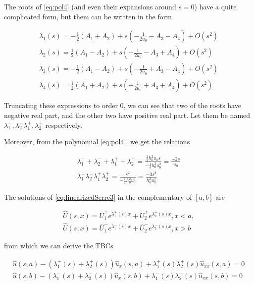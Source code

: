 \indent The roots of \eqref{eq:pol4} (and even their expansions around $s = 0$) have a quite complicated form, but them can be written in the form

\begin{gather*}
	\label{eq:rootsPol4}
	\lambda_1(s) = -\frac{1}{2}(A_1 + A_2) + s \left(-\frac{1}{2u_0} - A_3 - A_4 \right) + O(s^2)  \\
	\lambda_2(s) = \frac{1}{2}(A_1 - A_2) + s \left(-\frac{1}{2u_0} - A_3 + A_4\right) + O(s^2)  \\
	\lambda_3(s) =  -\frac{1}{2}(A_1 - A_2) + s \left(-\frac{1}{2u_0} + A_3 - A_4 \right) + O(s^2) \\
	\lambda_4(s) =  \frac{1}{2}(A_1 + A_2) + s \left(-\frac{1}{2u_0} + A_3 +A_4 \right) + O(s^2) 
\end{gather*} 

\indent Truncating these expressions to order 0, we can see that two of the roots have negative real part, and the other two have positive real part. Let them be named $\lambda^-_1,\lambda^-_2\lambda^+_1,\lambda^+_2$ respectively.

\indent Moreover, from the polynomial \eqref{eq:pol4}, we get the relations

\begin{gather}
	\label{eq:girardPol4A}
	\lambda^-_1 + \lambda^-_2 + \lambda^+_1 + \lambda^+_2 = \frac{\frac{2}{3} h_0^2u_0s}{-\frac{1}{3} h_0^2u_0^2} = \frac{-2s}{u_0} \\
	\label{eq:girardPol4B}
	\lambda^-_1 \lambda^-_2 \lambda^+_1 \lambda^+_2 = \frac{s^2}{-\frac{1}{3} h_0^2u_0^2} = \frac{-3s^2}{h_0^2u_0^2}
\end{gather}

\indent The solutions of \eqref{eq:linearizedSerre3} in the complementary of $[a,b]$ are

\begin{gather*}
	\hat{U}(s,x) = \overline{U}^+_1e^{\lambda^+_1(s)x} + \overline{U}^+_2e^{\lambda^+_2(s)x}, x < a, \\
	\hat{U}(s,x) = \overline{U}^-_1e^{\lambda^-_1(s)x} + \overline{U}^-_2e^{\lambda^-_2(s)x}, x > b
\end{gather*}

\indent from which we can derive the TBCs

\begin{gather*}
\hat{u}(s,a) - (\lambda^+_1(s) + \lambda^+_2(s))\hat{u}_x(s,a) + \lambda^+_1(s) \lambda^+_2(s)\hat{u}_{xx}(s,a) = 0 \\
\hat{u}(s,b) - (\lambda^-_1(s) + \lambda^-_2(s))\hat{u}_x(s,b) + \lambda^-_1(s) \lambda^-_2(s)\hat{u}_{xx}(s,b) = 0 \\
\end{gather*}


